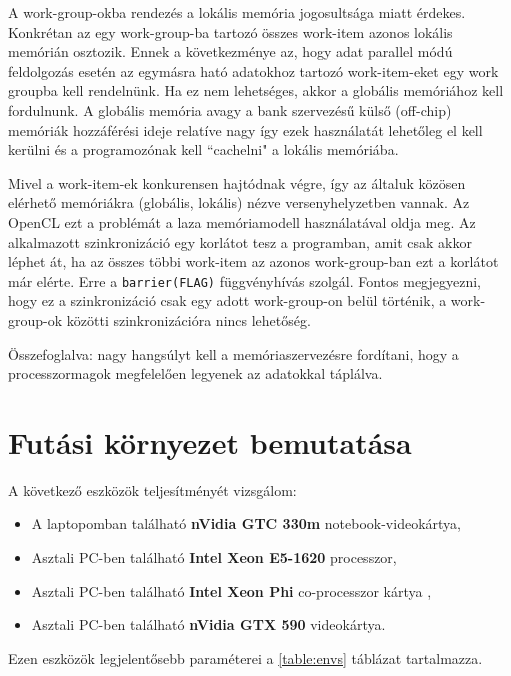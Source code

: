 	A work-group-okba rendezés a lokális memória jogosultsága miatt érdekes.
	Konkrétan az egy work-group-ba tartozó összes work-item azonos lokális memórián
	osztozik.
	Ennek a következménye az, hogy adat parallel módú feldolgozás esetén
	az egymásra ható adatokhoz tartozó work-item-eket egy work groupba kell
	rendelnünk.
	Ha ez nem lehetséges, akkor a globális memóriához kell fordulnunk.
	A globális memória avagy a bank szervezésű külső (off-chip) memóriák
	hozzáférési ideje relatíve nagy így ezek használatát lehetőleg el kell kerülni
	és a programozónak kell ``cachelni" a lokális memóriába.
	
	Mivel a work-item-ek konkurensen hajtódnak végre, így az általuk közösen elérhető memóriákra
	(globális, lokális) nézve versenyhelyzetben vannak.
	Az OpenCL ezt a problémát a laza memóriamodell használatával oldja meg. Az alkalmazott
	szinkronizáció egy korlátot tesz a programban, amit csak akkor léphet át, ha az összes többi
	work-item az azonos work-group-ban ezt a korlátot már elérte. Erre a \texttt{barrier(FLAG)}
	függvényhívás szolgál. Fontos megjegyezni, hogy ez a szinkronizáció csak egy adott
	work-group-on belül történik, a work-group-ok közötti szinkronizációra nincs lehetőség. 
	
	\begin{center}
	Összefoglalva: nagy hangsúlyt kell a memóriaszervezésre fordítani, hogy a
	processzormagok megfelelően legyenek az adatokkal táplálva.
	\end{center}


\section{Futási környezet bemutatása}
	A következő eszközök teljesítményét vizsgálom:
	\begin{itemize}
		\item A laptopomban található \textbf{nVidia GTC 330m} notebook-videokártya,
		\item Asztali PC-ben található \textbf{Intel Xeon E5-1620} processzor,
 		\item Asztali PC-ben található \textbf{Intel Xeon Phi} co-processzor kártya \cite{phi,mic},
 		\item Asztali PC-ben található  \textbf{nVidia GTX 590} videokártya.
	\end{itemize}
	Ezen eszközök legjelentősebb paraméterei a \ref{table:envs} táblázat tartalmazza.
	
